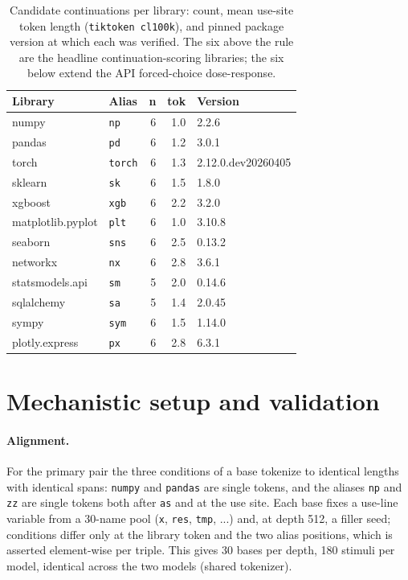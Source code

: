 \documentclass[11pt]{article}
\begin{document}
\begin{table}[t]
\centering
\small
\begin{tabular}{llrrl}
\toprule
\textbf{Library} & \textbf{Alias} & \textbf{n} & \textbf{tok} & \textbf{Version} \\
\midrule
numpy            & \texttt{np}    & 6 & 1.0 & 2.2.6 \\
pandas           & \texttt{pd}    & 6 & 1.2 & 3.0.1 \\
torch            & \texttt{torch} & 6 & 1.3 & 2.12.0.dev20260405 \\
sklearn          & \texttt{sk}    & 6 & 1.5 & 1.8.0 \\
xgboost          & \texttt{xgb}   & 6 & 2.2 & 3.2.0 \\
matplotlib.pyplot & \texttt{plt}  & 6 & 1.0 & 3.10.8 \\
\midrule
seaborn          & \texttt{sns}   & 6 & 2.5 & 0.13.2 \\
networkx         & \texttt{nx}    & 6 & 2.8 & 3.6.1 \\
statsmodels.api  & \texttt{sm}    & 5 & 2.0 & 0.14.6 \\
sqlalchemy       & \texttt{sa}    & 5 & 1.4 & 2.0.45 \\
sympy            & \texttt{sym}   & 6 & 1.5 & 1.14.0 \\
plotly.express   & \texttt{px}    & 6 & 2.8 & 6.3.1 \\
\bottomrule
\end{tabular}
\caption{Candidate continuations per library: count, mean use-site token length (\texttt{tiktoken cl100k}), and pinned package version at which each was verified. The six above the rule are the headline continuation-scoring libraries; the six below extend the API forced-choice dose-response.}
\label{tab:cand}
\end{table}

\section{Mechanistic setup and validation}
\label{sec:mechsetup}

\paragraph{Alignment.} For the primary pair the three conditions of a base tokenize to identical lengths with identical spans: \texttt{numpy} and \texttt{pandas} are single tokens, and the aliases \texttt{np} and \texttt{zz} are single tokens both after \texttt{as} and at the use site. Each base fixes a use-line variable from a 30-name pool (\texttt{x}, \texttt{res}, \texttt{tmp}, ...) and, at depth 512, a filler seed; conditions differ only at the library token and the two alias positions, which is asserted element-wise per triple. This gives 30 bases per depth, 180 stimuli per model, identical across the two models (shared tokenizer).
\end{document}
